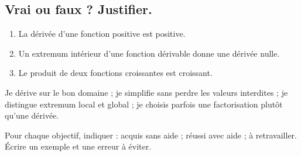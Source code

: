 \subsection*{Vrai ou faux ? Justifier.}\label{C06-VF}
\begin{enumerate}
\item La dérivée d’une fonction positive est positive.
\item Un extremum intérieur d’une fonction dérivable donne une dérivée nulle.
\item Le produit de deux fonctions croissantes est croissant.
\end{enumerate}
\begin{keypoint}Je dérive sur le bon domaine ; je simplifie sans perdre les valeurs interdites ; je distingue extremum local et global ; je choisis parfois une factorisation plutôt qu’une dérivée.

Pour chaque objectif, indiquer : acquis sans aide ; réussi avec aide ; à retravailler. Écrire un exemple et une erreur à éviter.\end{keypoint}
\endgroup
\ifmxteacher{}\fi

